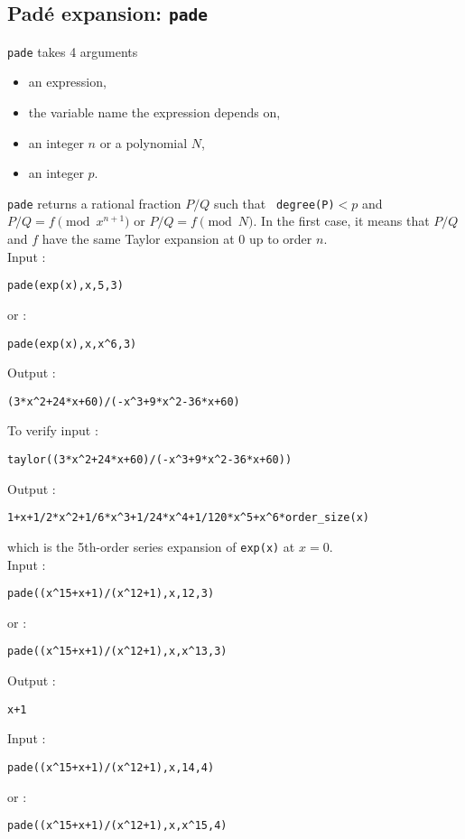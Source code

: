 \documentclass[a4paper,11pt]{book}
\begin{document}
\subsection{Pad\'e expansion: {\tt pade}}
{\tt pade} takes 4 arguments
\begin{itemize}
\item an expression, 
\item the variable name the expression depends on,
\item an integer $n$ or a polynomial $N$,
\item an integer $p$.
\end{itemize}
{\tt pade} returns a rational fraction  $P/Q$ such that {\tt
  degree(P)}$<p$ and $P/Q=f \pmod{x^{n+1}}$ or $P/Q=f \pmod{N}$.
In the first case, it means that $P/Q$ and $f$ have the same 
Taylor expansion at 0 up to order $n$.\\ 
Input :
\begin{center}{\tt pade(exp(x),x,5,3)}\end{center}
or :
\begin{center}{\tt pade(exp(x),x,x\verb|^|6,3)}\end{center}
Output :
\begin{center}{\tt (3*x\verb|^|2+24*x+60)/(-x\verb|^|3+9*x\verb|^|2-36*x+60)}\end{center}
To verify input :
\begin{center}{\tt taylor((3*x\verb|^|2+24*x+60)/(-x\verb|^|3+9*x\verb|^|2-36*x+60))}\end{center}
Output :
\begin{center}{\tt 1+x+1/2*x\verb|^|2+1/6*x\verb|^|3+1/24*x\verb|^|4+1/120*x\verb|^|5+x\verb|^|6*order\_size(x)}\end{center}
which is the 5th-order series expansion of {\tt exp(x)} at $x=0$.\\
Input :
\begin{center}{\tt pade((x\verb|^|15+x+1)/(x\verb|^|12+1),x,12,3)}\end{center}
or :
\begin{center}{\tt pade((x\verb|^|15+x+1)/(x\verb|^|12+1),x,x\verb|^|13,3)}\end{center}
Output :
\begin{center}{\tt x+1}\end{center}
Input :
\begin{center}{\tt pade((x\verb|^|15+x+1)/(x\verb|^|12+1),x,14,4)}\end{center}
or :
\begin{center}{\tt pade((x\verb|^|15+x+1)/(x\verb|^|12+1),x,x\verb|^|15,4)}\end{center}
\end{document}

